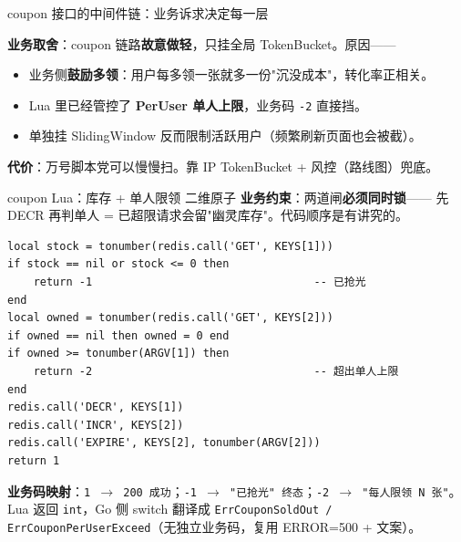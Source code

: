 \documentclass[aspectratio=169,11pt]{beamer}
\begin{document}
\begin{frame}[shrink]{coupon 接口的中间件链：业务诉求决定每一层}
\begin{center}
\end{center}
\vspace{2mm}
\small \textbf{业务取舍}：coupon 链路\textbf{故意做轻}，只挂全局 TokenBucket。原因——
\begin{itemize}\itemsep0pt
  \item 业务侧\textbf{鼓励多领}：用户每多领一张就多一份"沉没成本"，转化率正相关。
  \item Lua 里已经管控了 \textbf{PerUser 单人上限}，业务码 \texttt{-2} 直接挡。
  \item 单独挂 SlidingWindow 反而限制活跃用户（频繁刷新页面也会被截）。
\end{itemize}
\textbf{代价}：万号脚本党可以慢慢扫。靠 IP TokenBucket + 风控（路线图）兜底。
\end{frame}

\begin{frame}{coupon Lua：库存 + 单人限领 二维原子}
\small \textbf{业务约束}：两道闸\textbf{必须同时锁}—— 先 DECR 再判单人 = 已超限请求会留"幽灵库存"。代码顺序是有讲究的。
\begin{lstlisting}[language=LuaRedis,firstnumber=30,
  caption={}]
local stock = tonumber(redis.call('GET', KEYS[1]))
if stock == nil or stock <= 0 then
    return -1                                  -- 已抢光
end
local owned = tonumber(redis.call('GET', KEYS[2]))
if owned == nil then owned = 0 end
if owned >= tonumber(ARGV[1]) then
    return -2                                  -- 超出单人上限
end
redis.call('DECR', KEYS[1])
redis.call('INCR', KEYS[2])
redis.call('EXPIRE', KEYS[2], tonumber(ARGV[2]))
return 1
\end{lstlisting}
\vspace{-1mm}
\scriptsize \textbf{业务码映射}：\texttt{1 $\to$ 200 成功}；\texttt{-1 $\to$ "已抢光" 终态}；\texttt{-2 $\to$ "每人限领 N 张"}。Lua 返回 \texttt{int}，Go 侧 switch 翻译成 \texttt{ErrCouponSoldOut / ErrCouponPerUserExceed}（无独立业务码，复用 ERROR=500 + 文案）。
\end{frame}
\end{document}
